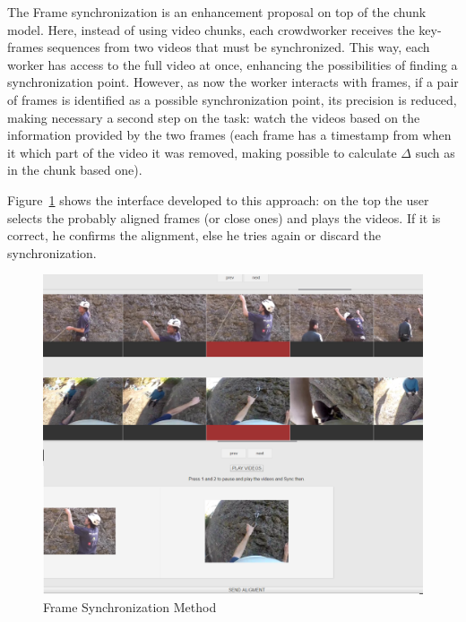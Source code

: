 \label{frame-sync}
The Frame synchronization is an enhancement proposal on top of the chunk model. Here, instead of using video chunks, each crowdworker receives the key-frames sequences from two videos that must be synchronized. This way, each worker has access to the full video at once, enhancing the possibilities of finding a synchronization point. However, as now the worker interacts with frames, if a pair of frames is identified as a possible synchronization point, its precision is reduced, making necessary a second step on the task: watch the videos based on the information provided by the two frames (each frame has a timestamp from when it which part of the video it was removed, making possible to calculate $\Delta$ such as in the chunk based one).

Figure~\ref{frames} shows the interface developed to this approach: on the top the user selects the probably aligned frames (or close ones) and plays the videos. If it is correct, he confirms the alignment, else he tries again or discard the synchronization. 

\begin{figure}[h]
	\centerline{\includegraphics[scale=0.25] {figure/frames}}
	\caption{Frame Synchronization Method}
	\label{frames}
\end{figure}